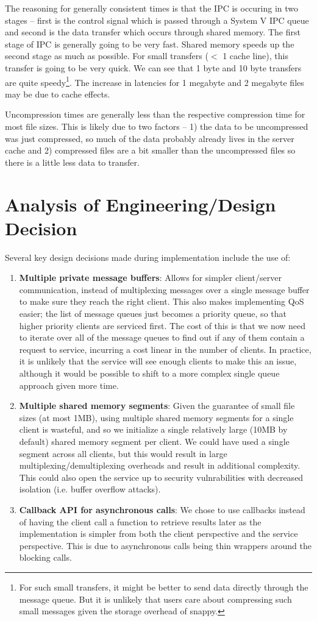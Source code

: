 \documentclass[paper=a4,fontsize=11pt]{report} %
\numberwithin{equation}{section} %
\numberwithin{figure}{section} %
\numberwithin{table}{section} %
\begin{document}
The reasoning for generally consistent times is that the IPC is occuring in two stages -- first is the control signal which is passed through a System V IPC queue and second is the data transfer which occurs through shared memory. The first stage of IPC is generally going to be very fast. Shared memory speeds up the second stage as much as possible. For small transfers ($<$ 1 cache line), this transfer is going to be very quick. We can see that 1 byte and 10 byte transfers are quite speedy\footnote{For such small transfers, it might be better to send data directly through the message queue. But it is unlikely that users care about compressing such small messages given the storage overhead of snappy.}. The increase in latencies for 1 megabyte and 2 megabyte files may be due to cache effects.

Uncompression times are generally less than the respective compression time for most file sizes. This is likely due to two factors -- 1) the data to be uncompressed was just compressed, so much of the data probably already lives in the server cache and 2) compressed files are a bit smaller than the uncompressed files so there is a little less data to transfer.

\section{Analysis of Engineering/Design Decision}
Several key design decisions made during implementation include the use of:
\begin{enumerate}
\item \textbf{Multiple private message buffers}: Allows for simpler client/server communication, instead of multiplexing messages over a single message buffer to make sure they reach the right client. This also makes implementing QoS easier; the list of message queues just becomes a priority queue, so that higher priority clients are serviced first. The cost of this is that we now need to iterate over all of the message queues to find out if any of them contain a request to service, incurring a cost linear in the number of clients. In practice, it is unlikely that the service will see enough clients to make this an issue, although it would be possible to shift to a more complex single queue approach given more time. 
\item \textbf{Multiple shared memory segments}: Given the guarantee of small file sizes (at most 1MB), using multiple shared memory segments for a single client is wasteful, and so we initialize a single relatively large (10MB by default) shared memory segment per client. We could have used a single segment across all clients, but this would result in large multiplexing/demultiplexing overheads and result in additional complexity. This could also open the service up to security vulnrabilities with decreased isolation (i.e. buffer overflow attacks).
\item \textbf{Callback API for asynchronous calls}: We chose to use callbacks instead of having the client call a function to retrieve results later as the implementation is simpler from both the client perspective and the service perspective. This is due to asynchronous calls being thin wrappers around the blocking calls.
\end{enumerate}
\end{document}
